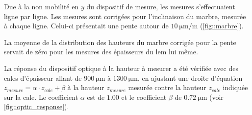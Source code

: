                     Due à la non mobilité en $y$ du dispositif de mesure, les mesures s'effectuaient ligne par ligne. Les mesures sont corrigées pour l'inclinaison du marbre, mesurée à chaque ligne. Celui-ci présentait une pente autour de $\SI{10}{\micro\meter\per\meter}$ (\autoref{fig::marbre}).
                    
                    La moyenne de la distribution des hauteurs du marbre corrigée pour la pente servait de zéro pour les mesures des épaisseurs du \gls{lem} lui même.
                    
                    La réponse du dispositif optique à la hauteur à mesurer a été vérifiée avec des cales d'épaisseur allant de $\SI{900}{\micro\meter}$ à $\SI{1300}{\micro\meter}$, en ajustant une droite d'équation $z_{mesure} = \alpha \cdot z_{cale} + \beta$ à la hauteur $z_{mesure}$ mesurée contre la hauteur $z_{cale}$ indiquée sur la cale. Le coefficient $\alpha$ est de $1.00$ et le coefficient $\beta$ de $\SI{0.72}{\micro\meter}$ (voir \autoref{fig::optic_response}).
                    
                    
                    
